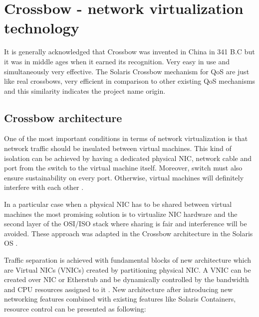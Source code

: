 \documentclass[11pt]{book}
\begin{document}
    \section{Crossbow - network virtualization technology}
    \label{sec:sol:xbow}


      It is generally acknowledged that Crossbow was invented in China in 341 B.C but it was in middle ages when 
      it earned its recognition. Very easy in use and simultaneously very effective. The Solaris Crossbow mechanism 
      for QoS are just like real crossbows, very efficient in comparison to other existing QoS mechanisms and this
      similarity indicates the project name origin.


      \subsection{Crossbow architecture}

        One of the most important conditions in terms of network virtualization is that network traffic should be
        insulated between virtual machines. This kind of isolation can be achieved by having a dedicated physical NIC,
        network cable and port from the switch to the virtual machine itself. Moreover, switch must also ensure
        sustainability on every port. Otherwise, virtual machines will definitely interfere with each other \cite{crossbow}.
        
        In a particular case when a physical NIC has to be shared between virtual machines the most promising solution is
        to virtualize NIC hardware and the second layer of the OSI/ISO stack where sharing is fair and interference
        will be avoided. These approach was adapted in the Crossbow architecture in the Solaris OS \cite{crossbow}.
        
        Traffic separation is achieved with fundamental blocks of new architecture which are Virtual NICs (VNICs)
        created by partitioning physical NIC. A VNIC can be created over NIC or Etherstub and
        be dynamically controlled by the bandwidth and CPU resources assigned to it
        \cite{crossbow,network_virtualization}. New architecture after introducing new networking features combined with
        existing features like Solaris Containers, resource control can be presented as following:
\end{document}
